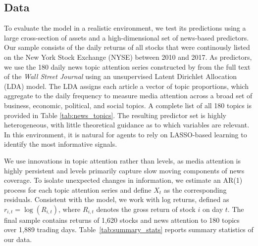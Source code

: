 \documentclass[11pt]{article}
\begin{document}
\subsection{Data}

To evaluate the model in a realistic environment, we test its predictions using a large cross-section of assets and a high-dimensional set of news-based predictors.
Our sample consists of the daily returns of all stocks that were continously listed on the New York Stock Exchange (NYSE) between 2010 and 2017.
As predictors, we use the 180 daily news topic attention series constructed by \citet{Bybee2021} from the full text of the \textit{Wall Street Journal} using an unsupervised Latent Dirichlet Allocation (LDA) model.
The LDA assigns each article a vector of topic proportions, which \citet{Bybee2021} aggregate to the daily frequency to measure media attention across a broad set of business, economic, political, and social topics.
A complete list of all 180 topics is provided in Table \ref{tab:news_topics}.
The resulting predictor set is highly heterogeneous, with little theoretical guidance as to which variables are relevant.
In this environment, it is natural for agents to rely on LASSO-based learning to identify the most informative signals.

We use innovations in topic attention rather than levels, as media attention is highly persistent and levels primarily capture slow moving components of news coverage. 
To isolate unexpected changes in information, we estimate an AR(1) process for each topic attention series and define $X_t$ as the corresponding residuals.
Consistent with the model, we work with log returns, defined as $r_{i,t} = \log(R_{i,t})$, where $R_{i,t}$ denotes the gross return of stock $i$ on day $t$. 
The final sample contains returns of 1{,}620 stocks and news attention to 180 topics over 1{,}889 trading days.
Table~\ref{tab:summary_stats} reports summary statistics of our data.
\end{document}
